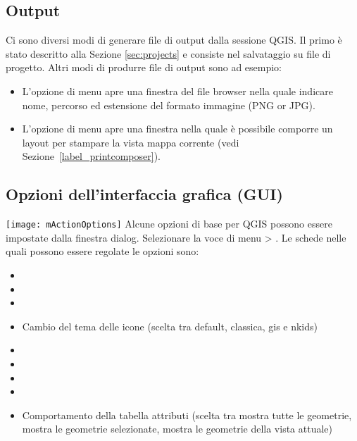 \subsection{Output}\label{sec:output}
Ci sono diversi modi di generare file di output dalla sessione QGIS.
Il primo è stato descritto alla Sezione \ref{sec:projects} e consiste nel
salvataggio su file di progetto. 
Altri modi di produrre file di output sono ad esempio:
\begin{itemize}
\item L'opzione di menu  apre una finestra del file browser nella quale indicare nome,
percorso ed estensione del formato immagine (PNG or JPG).
\item L'opzione di menu 
apre una finestra nella quale è possibile comporre un layout per stampare la
vista mappa corrente (vedi Sezione~\ref{label_printcomposer}).
\end{itemize}


\subsection{Opzioni dell'interfaccia grafica (GUI)}
\label{subsec:gui_options}
\texttt{[image: mActionOptions]} 
Alcune opzioni di base per QGIS possono essere impostate dalla finestra
 dialog. Selezionare la voce di menu  >
 . Le schede nelle quali possono
 essere regolate le opzioni sono:


\begin{itemize}
\item {}
\item {}
\item {}
\item Cambio del tema delle icone (scelta tra default, classica, gis e nkids)
\item {}
\item {}
\item {}
\item {}
\item Comportamento della tabella attributi (scelta tra mostra tutte le
geometrie, mostra le geometrie selezionate, mostra le geometrie della vista
attuale)
\end{itemize}

